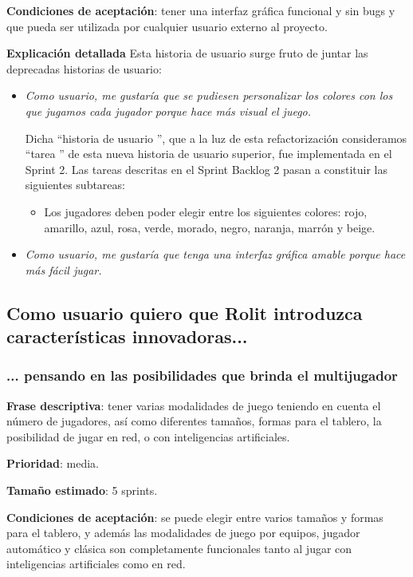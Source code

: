 \documentclass[../../FINAL/Scrum/SCRUM.tex]{subfiles}
\begin{document}
\textbf{Condiciones de aceptación}: tener una interfaz gráfica funcional y sin bugs y que pueda ser utilizada por cualquier usuario externo al proyecto.

\textbf{Explicación detallada}
Esta historia de usuario surge fruto de juntar las deprecadas historias de usuario:
\begin{itemize}
\item  \textit{Como usuario, me gustaría que se pudiesen personalizar los colores con los que jugamos cada jugador porque hace más visual el juego. }

    Dicha  ``historia de usuario '', que a la luz de esta refactorización consideramos  ``tarea '' de esta nueva historia de usuario superior, fue implementada en el Sprint 2. Las tareas descritas en el Sprint Backlog 2 pasan a constituir las siguientes subtareas:
	\begin{itemize}
     \item Los jugadores deben poder elegir entre los siguientes colores: rojo, amarillo, azul, rosa, verde, morado, negro, naranja, marrón y beige.
     \end{itemize}

\item  \textit{Como usuario, me gustaría que tenga una interfaz gráfica amable porque hace más fácil jugar.}
\end{itemize}

\subsection{Como usuario quiero que Rolit introduzca características innovadoras...}
\subsubsection{... pensando en las posibilidades que brinda el multijugador}
\textbf{Frase descriptiva}: tener varias modalidades de juego teniendo en cuenta el número de jugadores, así como diferentes tamaños, formas para el tablero, la posibilidad de jugar en red, o con inteligencias artificiales.

\textbf{Prioridad}: media.

\textbf{Tamaño estimado}: 5 sprints.

\textbf{Condiciones de aceptación}: se puede elegir entre varios tamaños y formas para el tablero, y además las modalidades de juego por equipos, jugador automático y clásica son completamente funcionales tanto al jugar con inteligencias artificiales como en red.
\end{document}

